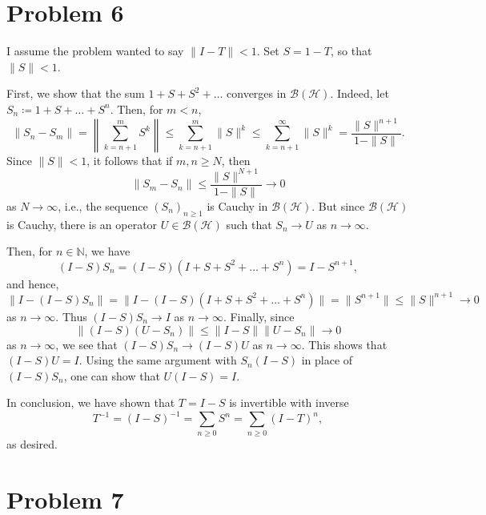 \documentclass[10pt]{amsart}
\theoremstyle{thmstyle}
\theoremstyle{defstyle}
\newcommand{\N}{\mathbb{N}}
\newcommand{\calH}{\mathcal{H}} %
\newcommand{\scrB}{\mathscr B}
\renewcommand{\le}{\leqslant}
\renewcommand{\ge}{\geqslant}
\begin{document}
\section{Problem 6}

I assume the problem wanted to say $\|I - T\| < 1$. Set $S = 1 - T$, so that $\|S\| < 1$. 

First, we show that the sum $1 + S + S^2 + \dots$ converges in $\scrB(\calH)$. Indeed, let $S_n\coloneq 1 + S + \dots + S^n$. Then, for $m < n$, 
\begin{equation*}
    \|S_n - S_m\| = \left\|\sum_{k = n + 1}^m S^k\right\|\le\sum_{k = n + 1}^m \|S\|^k\le\sum_{k = n + 1}^\infty\|S\|^k = \frac{\|S\|^{n + 1}}{1 - \|S\|}.
\end{equation*}
Since $\|S\| < 1$, it follows that if $m,n\ge N$, then 
\begin{equation*}
    \|S_m - S_n\|\le\frac{\|S\|^{N + 1}}{1 - \|S\|}\to 0
\end{equation*}
as $N\to\infty$, i.e., the sequence $(S_n)_{n\ge 1}$ is Cauchy in $\scrB(\calH)$. But since $\scrB(\calH)$ is Cauchy, there is an operator $U\in\scrB(\calH)$ such that $S_n\to U$ as $n\to\infty$.


Then, for $n\in\N$, we have 
\begin{equation*}
    (I - S)S_n = (I - S)(I + S + S^2 + \dots + S^n) = I - S^{n + 1},
\end{equation*}
and hence, 
\begin{equation*}
    \|I - (I - S)S_n\| = \|I - (I - S)(I + S + S^2 + \dots + S^n)\| = \|S^{n + 1}\|\le \|S\|^{n + 1}\to 0
\end{equation*}
as $n\to\infty$. Thus $(I - S)S_n\to I$ as $n\to\infty$. Finally, since 
\begin{equation*}
    \|(I - S)(U - S_n)\|\le\|I - S\|\|U - S_n\|\to 0
\end{equation*}
as $n\to\infty$, we see that $(I - S)S_n\to (I - S)U$ as $n\to\infty$. This shows that $(I - S)U = I$. Using the same argument with $S_n(I - S)$ in place of $(I - S)S_n$, one can show that $U(I - S) = I$. 

In conclusion, we have shown that $T = I - S$ is invertible with inverse 
\begin{equation*}
    T^{-1} = (I - S)^{-1} = \sum_{n\ge 0} S^n = \sum_{n\ge 0}(I - T)^n,
\end{equation*}
as desired.

\section{Problem 7}
\end{document}
